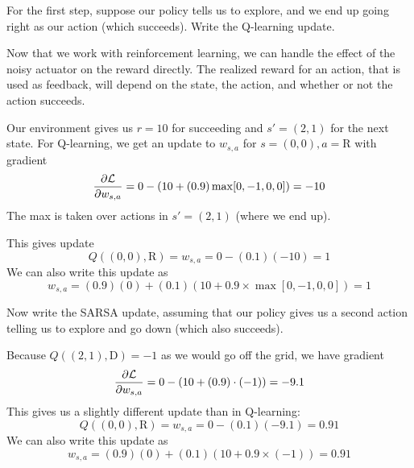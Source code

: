 \documentclass[12pt]{article}
\begin{document}
\noindent {}

\vspace{.5pc}

For the first step, suppose our policy tells us to explore, and we end up going right as our action (which succeeds). Write the Q-learning update.
\medskip

\begin{solution}
    Now that we work with reinforcement learning, we can handle the effect of the noisy actuator on the reward directly. The realized reward for an action, that is used as feedback, will depend on the state, the action, and whether or not the action succeeds.

  Our environment gives us $r = 10$ for succeeding and $s' = (2,1)$ for the next state. For Q-learning, we get an update to $w_{s,a}$ for $s=(0,0), a=\text{R}$ with gradient
$$\frac{\partial \mathcal{L}}{\partial w_{s,a}} = 0 - (10 + (0.9) \max [0,-1,0,0] )= -10$$
The max is taken over actions in $s'=(2,1)$ (where we end up).

This gives update
$$Q((0,0), \text{R}) = w_{s,a} = 0 - (0.1)(-10) = 1$$
We can also write this update as
$$w_{s,a} = (0.9)(0) + (0.1)(10 + 0.9 \times \max[0,-1,0,0]) = 1$$

\end{solution}

\vspace{.5cm}
\bigskip

Now write the SARSA update, assuming that our policy gives us a second action telling us to explore and go down (which also succeeds).
\bigskip

\begin{solution}
 Because $Q((2,1), \text{D}) = -1$ as we would go off the grid, we have gradient
$$\frac{\partial \mathcal{L}}{\partial w_{s,a}} = 0 - (10 + (0.9) \cdot (-1)) = -9.1$$
This gives us a slightly different update than in Q-learning:
$$Q((0,0), \text{R}) = w_{s,a} = 0 - (0.1)(-9.1) = 0.91$$
We can also write this update as
$$w_{s,a} = (0.9)(0) + (0.1)(10 + 0.9 \times (-1)) = 0.91$$
\end{solution}
\end{document}

